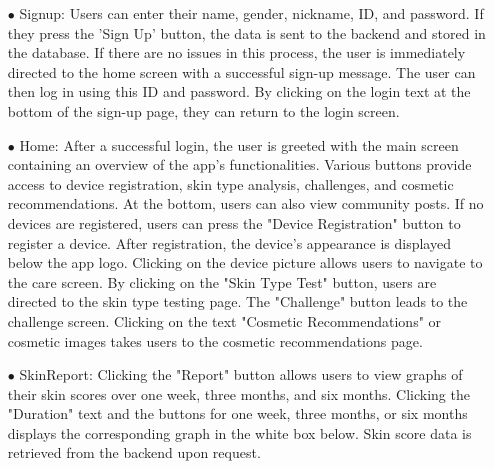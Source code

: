 \documentclass[conference]{IEEEtran}
\begin{document}
\begin{itemize}
\begin{itemize}
   
    \item[$\bullet$] Signup: Users can enter their name, gender, nickname, ID, and password. If they press the 'Sign Up' button, the data is sent to the backend and stored in the database. If there are no issues in this process, the user is immediately directed to the home screen with a successful sign-up message. The user can then log in using this ID and password. By clicking on the login text at the bottom of the sign-up page, they can return to the login screen.
    \item[$\bullet$] Home: After a successful login, the user is greeted with the main screen containing an overview of the app's functionalities. Various buttons provide access to device registration, skin type analysis, challenges, and cosmetic recommendations. At the bottom, users can also view community posts. If no devices are registered, users can press the "Device Registration" button to register a device. After registration, the device's appearance is displayed below the app logo. Clicking on the device picture allows users to navigate to the care screen. By clicking on the "Skin Type Test" button, users are directed to the skin type testing page. The "Challenge" button leads to the challenge screen. Clicking on the text "Cosmetic Recommendations" or cosmetic images takes users to the cosmetic recommendations page.
    \item[$\bullet$] SkinReport: Clicking the "Report" button allows users to view graphs of their skin scores over one week, three months, and six months. Clicking the "Duration" text and the buttons for one week, three months, or six months displays the corresponding graph in the white box below. Skin score data is retrieved from the backend upon request.
    

\end{itemize}
\end{itemize}
\end{document}
